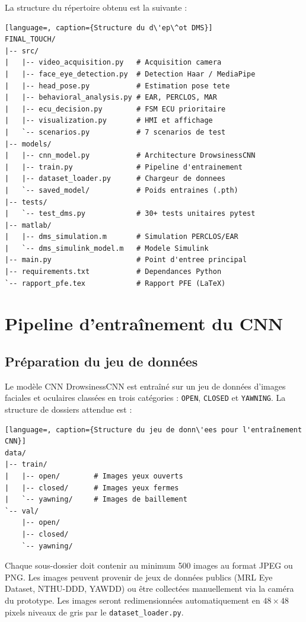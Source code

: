 \documentclass[12pt,a4paper]{report}
\begin{document}
La structure du r\'epertoire obtenu est la suivante :
\begin{lstlisting}[language=, caption={Structure du d\'ep\^ot DMS}]
FINAL_TOUCH/
|-- src/
|   |-- video_acquisition.py   # Acquisition camera
|   |-- face_eye_detection.py  # Detection Haar / MediaPipe
|   |-- head_pose.py           # Estimation pose tete
|   |-- behavioral_analysis.py # EAR, PERCLOS, MAR
|   |-- ecu_decision.py        # FSM ECU prioritaire
|   |-- visualization.py       # HMI et affichage
|   `-- scenarios.py           # 7 scenarios de test
|-- models/
|   |-- cnn_model.py           # Architecture DrowsinessCNN
|   |-- train.py               # Pipeline d'entrainement
|   |-- dataset_loader.py      # Chargeur de donnees
|   `-- saved_model/           # Poids entraines (.pth)
|-- tests/
|   `-- test_dms.py            # 30+ tests unitaires pytest
|-- matlab/
|   |-- dms_simulation.m       # Simulation PERCLOS/EAR
|   `-- dms_simulink_model.m   # Modele Simulink
|-- main.py                    # Point d'entree principal
|-- requirements.txt           # Dependances Python
`-- rapport_pfe.tex            # Rapport PFE (LaTeX)
\end{lstlisting}

\section{Pipeline d'entra\^inement du CNN}

\subsection{Pr\'eparation du jeu de donn\'ees}

Le mod\`ele CNN DrowsinessCNN est entra\^in\'e sur un jeu de donn\'ees d'images faciales et oculaires class\'ees en trois cat\'egories : \texttt{OPEN}, \texttt{CLOSED} et \texttt{YAWNING}. La structure de dossiers attendue est :

\begin{lstlisting}[language=, caption={Structure du jeu de donn\'ees pour l'entraînement CNN}]
data/
|-- train/
|   |-- open/        # Images yeux ouverts
|   |-- closed/      # Images yeux fermes
|   `-- yawning/     # Images de baillement
`-- val/
    |-- open/
    |-- closed/
    `-- yawning/
\end{lstlisting}

Chaque sous-dossier doit contenir au minimum 500 images au format JPEG ou PNG. Les images peuvent provenir de jeux de donn\'ees publics (MRL Eye Dataset, NTHU-DDD, YAWDD) ou \^etre collect\'ees manuellement via la cam\'era du prototype. Les images seront redimensionn\'ees automatiquement en $48 \times 48$ pixels niveaux de gris par le \texttt{dataset\_loader.py}.
\end{document}
